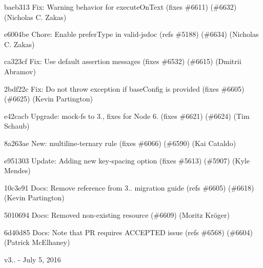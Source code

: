 \begin{DoxyItemize}
\item baeb313 Fix\+: Warning behavior for execute\+On\+Text (fixes \#6611) (\#6632) (Nicholas C. Zakas)
\item e6004be Chore\+: Enable prefer\+Type in valid-\/jsdoc (refs \#5188) (\#6634) (Nicholas C. Zakas)
\item ca323cf Fix\+: Use default assertion messages (fixes \#6532) (\#6615) (Dmitrii Abramov)
\item 2bdf22c Fix\+: Do not throw exception if base\+Config is provided (fixes \#6605) (\#6625) (Kevin Partington)
\item e42cacb Upgrade\+: mock-\/fs to 3., fixes for Node 6. (fixes \#6621) (\#6624) (Tim Schaub)
\item 8a263ae New\+: multiline-\/ternary rule (fixes \#6066) (\#6590) (Kai Cataldo)
\item e951303 Update\+: Adding new {\ttfamily key-\/spacing} option (fixes \#5613) (\#5907) (Kyle Mendes)
\item 10c3e91 Docs\+: Remove reference from 3.. migration guide (refs \#6605) (\#6618) (Kevin Partington)
\item 5010694 Docs\+: Removed non-\/existing resource (\#6609) (Moritz Kröger)
\item 6d40d85 Docs\+: Note that PR requires A\+C\+C\+E\+P\+T\+ED issue (refs \#6568) (\#6604) (Patrick Mc\+Elhaney)
\end{DoxyItemize}

v3.. -\/ July 5, 2016


